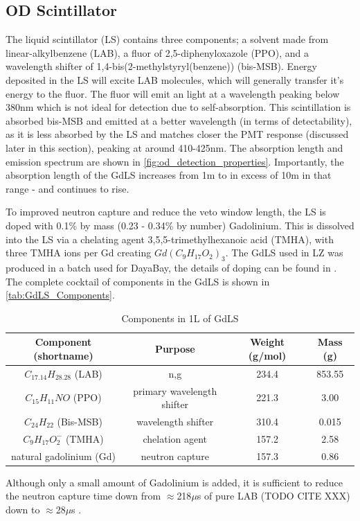 \subsection{OD Scintillator}
\par
The liquid scintillator (LS) contains three components; a solvent made from linear-alkylbenzene (LAB), a fluor of 2,5-diphenyloxazole (PPO), and a wavelength shifter of 1,4-bis(2-methylstyryl(benzene)) (bis-MSB).
Energy deposited in the LS will excite LAB molecules, which will generally transfer it's energy to the fluor. 
The fluor will emit an light at a wavelength peaking below 380nm which is not ideal for detection due to self-absorption.
This scintillation is absorbed bis-MSB and emitted at a better wavelength (in terms of detectability), as it is less absorbed by the LS and matches closer the PMT response (discussed later in this section), peaking at around 410-425nm.
The absorption length and emission spectrum are shown in \autoref{fig:od_detection_properties}.
Importantly, the absorption length of the GdLS increases from 1m to in excess of 10m in that range - and continues to rise.



\par
To improved neutron capture and reduce the veto window length, the LS is doped with 0.1\% by mass (0.23 - 0.34\% by number) Gadolinium.
This is dissolved into the LS via a chelating agent 3,5,5-trimethylhexanoic acid (TMHA), with three TMHA ions per Gd creating $Gd({C}_{9}{H}_{17}{O}_{2})_{3}$.
The GdLS used in LZ was produced in a batch used for DayaBay, the details of doping can be found in \cite{dayabay_gd_doping_ref}.
The complete cocktail of components in the GdLS is shown in \autoref{tab:GdLS_Components}.

\begin{table}[!htbp]
    \centering
    \begin{tabular}{c | c | c | c}
    \hline
    {Component (shortname)} & {Purpose} & {Weight (g/mol)} & {Mass (g)} \\ \hline
    $C_{17.14}H_{28.28}$ (LAB) & n,g & 234.4  & 853.55 \\
    $C_{15}H_{11}NO$ (PPO) & primary wavelength shifter & 221.3 & 3.00 \\
    $C_{24}H_{22}$ (Bis-MSB) & wavelength shifter & 310.4 & 0.015 \\
    $C_{9}H_{17}O^{-}_{2}$ (TMHA) & chelation agent & 157.2 & 2.58 \\
    natural gadolinium (Gd) & neutron capture & 157.3 & 0.86 
    \end{tabular}
    \caption{Components in 1L of GdLS}
    \label{tab:GdLS_Components}
\end{table} 
\par
Although only a small amount of Gadolinium is added, it is sufficient to reduce the neutron capture time down from $\approx$218$\mu$s of pure LAB (TODO CITE XXX) down to $\approx$28$\mu$s \cite{ucsb_gdls_dicebox_simulations_ref}.


